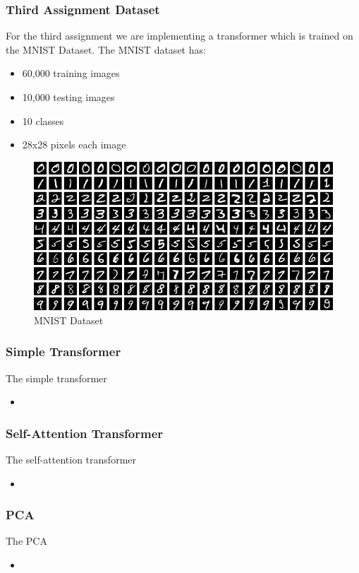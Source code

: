 \begin{frame}
    \frametitle{Third Assignment Dataset}
    For the third assignment we are implementing a transformer which is 
    trained on the MNIST Dataset. The MNIST dataset has:
    \begin{itemize}
        \item 60,000 training images
        \item 10,000 testing images
        \item 10 classes
        \item 28x28 pixels each image
    \end{itemize}
    \begin{figure}
        \centering
        \includegraphics[height=0.4\textheight]{media/3rdAssignment/MNIST_dataset_example.png}
        \caption{MNIST Dataset}
    \end{figure}
\end{frame}

\begin{frame}
    \frametitle{Simple Transformer}
    The simple transformer 
    \begin{itemize}
        \item 
    \end{itemize}
\end{frame}

\begin{frame}
    \frametitle{Self-Attention Transformer}
    The self-attention transformer 
    \begin{itemize}
        \item 
    \end{itemize}
\end{frame}

\begin{frame}
    \frametitle{PCA}
    The PCA 
    \begin{itemize}
        \item 
    \end{itemize}
\end{frame}


